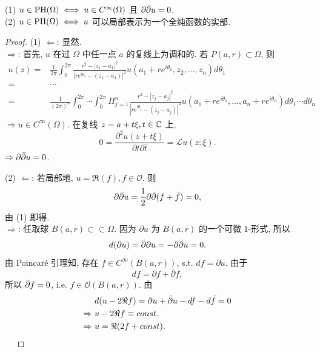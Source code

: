 \begin{proposition}
  (1) $u \in \operatorname{PH} (\Omega ) \iff u \in C^{\infty }(\Omega )$ 且 ${\partial \bar{\partial}} u=0$.\\
  (2) $u \in \operatorname{PH} (\Omega ) \iff u$ 可以局部表示为一个全纯函数的实部.  
\end{proposition}
\begin{proof}
  (1) $\Leftarrow $: 显然. \\
  $\Rightarrow $: 首先, $u$ 在过 $\Omega $ 中任一点 $a$ 的复线上为调和的.   若 $P(a,r) \subset \Omega $, 则 
  $$ \begin{aligned}
    u(z)=& \frac{1}{2 \pi }\int_{0}^{2 \pi } \frac{r^2-\left| z_1-a_1 \right| ^2}{\left| r e^{i \theta _1}-(z_1-a_1) \right| ^2} u(a_1+r e^{i \theta _1},z_2,\dots,z_n) d \theta _1\\
    =& \cdots \\
    =&  \frac{1}{(2 \pi )^n}\int_{0}^{2 \pi } \cdots \int_{0}^{2 \pi } \Pi _{j=1}^{n} \frac{r^2-\left| z_j-a_j \right| ^2}{\left| r e^{i \theta _j}-(z_j-a_j) \right| ^2} u(a_1+r e^{i \theta _1},\dots,a_n+r e^{i \theta _n}) d \theta _1 \cdots d \theta _n
  \end{aligned}  $$   
  $\Rightarrow u \in C^{\infty }(\Omega )$.
  在复线 $z=a+t\xi, t \in {\mathbb C} $ 上, 
  $$ 0=\frac{\partial^2 u (z+t \xi ) }{\partial t \partial \bar{t}} =\mathcal{L}u (z;\xi ).$$  
  $\Rightarrow {\partial \bar{\partial}} u =0$.
  
  (2) $\Leftarrow $: 若局部地, $u =\Re (f), f \in \mathcal{O}$. 则 
  $$ {\partial \bar{\partial}} u =\frac{1}{2} {\partial \bar{\partial}} (f+\bar{f})=0, $$
  由 (1) 即得.  \\
  $\Rightarrow $: 任取球 $B(a,r ) \subset \subset \Omega $. 
  因为 $\partial u$ 为 $B(a,r)$ 的一个可微 $1$-形式, 所以
  $$ d(\partial u)= \bar{\partial } \partial u=-{\partial \bar{\partial}} u =0. $$     
  由 Poincar\'e 引理知, 存在 $f \in C^{\infty }(B(a,r))$, s.t. $df=\partial u$. 
  由于 
  $$ d f =\partial f +\bar{\partial }f ,$$
  所以 ${\bar{\partial}} f =0$, i.e. $f \in \mathcal{O}(B(a,r))$. 
  由 
  $$ \begin{aligned}
    &d(u-2\Re f)= \partial u+{\bar{\partial}} u -df-d \bar{f}=0\\
    \Rightarrow~ & u-2 \Re f \equiv const.\\
    \Rightarrow~ &u=\Re (2f+const).
  \end{aligned}  $$  
  ~~
\end{proof}


